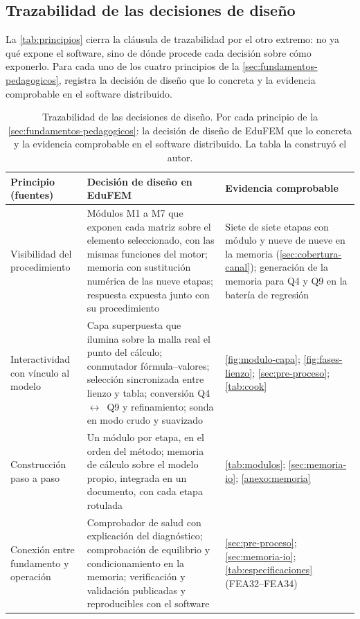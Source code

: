 \subsection{Trazabilidad de las decisiones de diseño}
\label{sec:trazabilidad-diseno}

La \autoref{tab:principios} cierra la cláusula de trazabilidad por el otro extremo: no ya qué expone el software, sino de dónde procede cada decisión sobre cómo exponerlo. Para cada uno de los cuatro principios de la \autoref{sec:fundamentos-pedagogicos}, registra la decisión de diseño que lo concreta y la evidencia comprobable en el software distribuido.

\begin{table}[htbp]
\centering
\caption[Principios, decisiones de diseño y evidencia.]{Trazabilidad de las decisiones de diseño. Por cada principio de la \autoref{sec:fundamentos-pedagogicos}: la decisión de diseño de EduFEM que lo concreta y la evidencia comprobable en el software distribuido. La tabla la construyó el autor.}
\label{tab:principios}
{\footnotesize
\setlength{\tabcolsep}{3pt}
\renewcommand{\arraystretch}{1.12}
\begin{tabular}{@{}>{\raggedright\arraybackslash}p{3.4cm}>{\raggedright\arraybackslash}p{5.6cm}>{\raggedright\arraybackslash}p{5.4cm}@{}}
\toprule
\textbf{Principio (fuentes)} & \textbf{Decisión de diseño en EduFEM} & \textbf{Evidencia comprobable} \\
\midrule
Visibilidad del procedimiento \autocite[p.~157]{lee2015interactive} & Módulos M1 a M7 que exponen cada matriz sobre el elemento seleccionado, con las mismas funciones del motor; memoria con sustitución numérica de las nueve etapas; respuesta expuesta junto con su procedimiento & Siete de siete etapas con módulo y nueve de nueve en la memoria (\autoref{sec:cobertura-canal}); generación de la memoria para Q4 y Q9 en la batería de regresión \\
Interactividad con vínculo al modelo \autocite[pp.~163, 166]{lee2015interactive} & Capa superpuesta que ilumina sobre la malla real el punto del cálculo; conmutador fórmula--valores; selección sincronizada entre lienzo y tabla; conversión Q4~$\leftrightarrow$~Q9 y refinamiento; sonda en modo crudo y suavizado & \autoref{fig:modulo-capa}; \autoref{fig:fases-lienzo}; \autoref{sec:pre-proceso}; \autoref{tab:cook} \\
Construcción paso a paso \autocite[pp.~4-5, 17]{bishay2020teaching} & Un módulo por etapa, en el orden del método; memoria de cálculo sobre el modelo propio, integrada en un documento, con cada etapa rotulada & \autoref{tab:modulos}; \autoref{sec:memoria-io}; \autoref{anexo:memoria} \\
Conexión entre fundamento y operación \autocite[pp.~1159, 1168]{perezsantiago2023fem} & Comprobador de salud con explicación del diagnóstico; comprobación de equilibrio y condicionamiento en la memoria; verificación y validación publicadas y reproducibles con el software & \autoref{sec:pre-proceso}; \autoref{sec:memoria-io}; \autoref{tab:especificaciones} (FEA32--FEA34) \\
\bottomrule
\end{tabular}}
\end{table}


